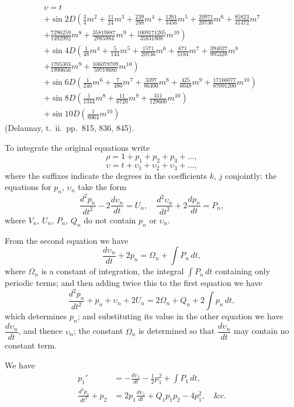 \documentclass[11pt,a4paper]{article}
\theoremstyle{plain}
\theoremstyle{definition}
\theoremstyle{remark}
\begin{document}
\begin{multline*}
\upsilon = t\\
+ \sin 2D\left(\tfrac34 m^{2} + \tfrac{11}{24}m^{3} + \tfrac{239}{288}m^{4} + \tfrac{1261}{3456}m^{5} + \tfrac{20971}{20736}m^{6} + \tfrac{85823}{41472}m^{7}\right.\\
\left. + \tfrac{7296259}{1492992}m^{8} + \tfrac{35819887}{2985984}m^{9} + \tfrac{1009171205}{35831808}m^{10}\right)\\
+ \sin 4D\left(\tfrac{1}{48}m^{4} + \tfrac{5}{144}m^{5} + \tfrac{1571}{20736}m^{6} + \tfrac{671}{5184}m^{7} + \tfrac{394027}{995328}m^{8}\right.\\
\left. + \tfrac{1705303}{1990656}m^{9} + \tfrac{106078709}{59719680}m^{10}\right)\\
+ \sin 6D\left(\tfrac{1}{240}m^{6} + \tfrac{7}{480}m^{7} + \tfrac{3397}{86400}m^{8} + \tfrac{425}{6048}m^{9} + \tfrac{17166077}{87091200}m^{10}\right)\\
+ \sin 8D\left(\tfrac{1}{1344}m^{8} + \tfrac{11}{6720}m^{9} + \tfrac{311}{129600}m^{10}\right)\\
+ \sin 10D\left(\tfrac{1}{8064}m^{10}\right)
\end{multline*}
(Delaunay, t.\ ii.\ pp.\ 815, 836, 845).

To integrate the original equations write
\[
\rho = 1 + p_{1} + p_{2} + p_{3} + \dots,
\]
\[
\upsilon = t + \upsilon_{1} + \upsilon_{2} + \upsilon_{3} + \dots,
\]
where the suffixes indicate the degrees in the coefficients $k$, $j$ conjointly: the equations for $p_{n}$, $\upsilon_{n}$ take the form
\[
\frac{d^{2}p_{n}}{dt^{2}} - 2\frac{d\upsilon_{n}}{dt} = U_{n}, \quad \frac{d^{2}\upsilon_{n}}{dt^{2}} + 2\frac{dp_{n}}{dt} = P_{n},
\]
where $V_{n}$, $U_{n}$, $P_{n}$, $Q_{n}$ do not contain $p_{n}$ or $\upsilon_{n}$.

From the second equation we have
\[
\frac{d\upsilon_{n}}{dt} + 2p_{n} = \Omega_{n} + \int P_{n}\,dt,
\]
where $\Omega_{n}$ is a constant of integration, the integral $\int P_{n}\,dt$ containing only periodic terms; and then adding twice this to the first equation we have
\[
\frac{d^{2}p_{n}}{dt^{2}} + p_{n} + \upsilon_{n} + 2U_{n} = 2\Omega_{n} + Q_{n} + 2\int p_{n}\,dt,
\]
which determines $p_{n}$; and substituting its value in the other equation we have $\dfrac{d\upsilon_{n}}{dt}$, and thence $\upsilon_{n}$; the constant $\Omega_{n}$ is determined so that $\dfrac{d\upsilon_{n}}{dt}$ may contain no constant term.

We have
\begin{align*}
p_{1}' &= -\frac{d\upsilon_{1}}{dt} - \tfrac12 p_{1}^{2} + \int P_{1}\,dt,\\
\frac{d^{2}p_{2}}{dt^{2}} + p_{2} &= 2p_{1}\frac{d\upsilon_{1}}{dt} + Q_{1}p_{1}p_{2} - 4p_{1}^{2}, \quad \&\text{c.}
\end{align*}
\end{document}
